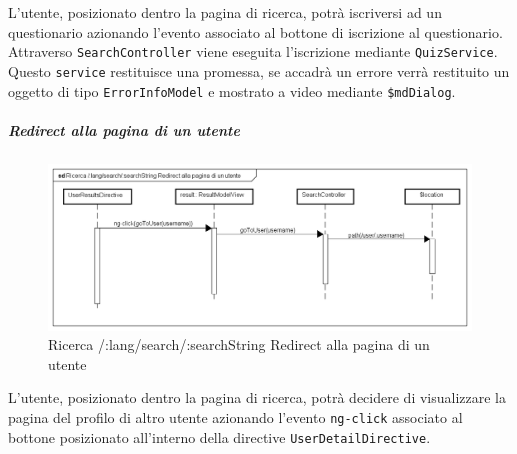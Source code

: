 L'utente, posizionato dentro la pagina di ricerca, potrà iscriversi ad un questionario azionando l'evento associato al bottone di iscrizione al questionario. Attraverso \texttt{SearchController} viene eseguita l'iscrizione mediante \texttt{QuizService}. Questo \texttt{service} restituisce una promessa, se accadrà un errore verrà restituito un oggetto di tipo \texttt{ErrorInfoModel} e mostrato a video mediante \texttt{\$mdDialog}.


\subparagraph{Redirect alla pagina di un utente}

\label{Ricerca /:lang/search/:searchString Redirect alla pagina di un utente}

\begin{figure}[ht]
	\centering
	\includegraphics[scale=0.5,keepaspectratio]{UML/DiagrammiDiSequenza/Front-end/Search_goToUser.png}
	\caption{Ricerca /:lang/search/:searchString Redirect alla pagina di un utente}
\end{figure} \FloatBarrier

L'utente, posizionato dentro la pagina di ricerca, potrà decidere di visualizzare la pagina del profilo di altro utente azionando l'evento \texttt{ng-click} associato al bottone posizionato all'interno della directive \texttt{UserDetailDirective}.